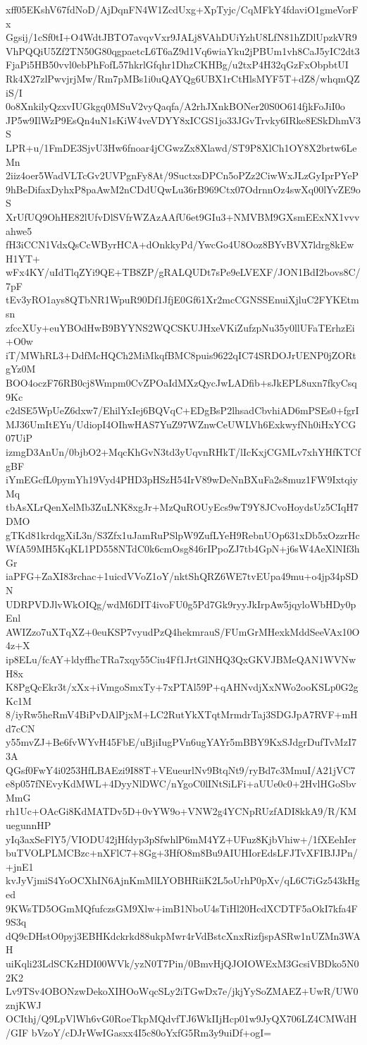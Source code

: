 xff05EKshV67fdNoD/AjDqnFN4W1ZcdUxg+XpTyjc/CqMFkY4fdaviO1gmeVorFx
Ggsij/1cSf0tI+O4WdtJBTO7avqvVxr9JALj8VAhDUiYzhU8LfN81hZDlUpzkVR9
VhPQQiU5Zf2TN50G80qgpaetcL6T6aZ9d1Vq6wiaYku2jPBUm1vh8CaJ5yIC2dt3
FjaPi5HB50vvl0ebPhFofL57hkrlGfqhr1DhzCKHBg/u2txP4H32qGzFxObpbtUI
Rk4X27zlPwvjrjMw/Rm7pMBs1i0uQAYQg6UBX1rCtHlsMYF5T+dZ8/whqmQZiS/I
0o8XnkilyQzxvIUGkgq0MSuV2vyQaqfa/A2rhJXnkBONer20S0O614fjkFoJiI0o
JP5w9IlWzP9EsQn4uN1sKiW4veVDYY8xICGS1jo33JGvTrvky6IRke8ESkDhmV3S
LPR+u/1FmDE3SjvU3Hw6fnoar4jCGwzZx8Xlawd/ST9P8XlCh1OY8X2brtw6LeMn
2iiz4oer5WadVLTcGv2UVPgnFy8At/9SuctxsDPCn5oPZz2CiwWxJLzGyIprPYeP
9hBeDifaxDyhxP8paAwM2nCDdUQwLu36rB969Ctx07OdrnnOz4swXq00lYvZE9oS
XrUfUQ9OhHE82lUfvDlSVfrWZAzAAfU6et9GIu3+NMVBM9GXsmEExNX1vvvahwe5
fH3iCCN1VdxQsCcWByrHCA+dOnkkyPd/YwcGo4U8Ooz8BYvBVX7ldrg8kEwH1YT+
wFx4KY/uIdTlqZYi9QE+TB8ZP/gRALQUDt7sPe9eLVEXF/JON1BdI2bovs8C/7pF
tEv3yRO1ays8QTbNR1WpuR90Df1JfjE0Gf61Xr2mcCGNSSEnuiXjluC2FYKEtmsn
zfccXUy+euYBOdHwB9BYYNS2WQCSKUJHxeVKiZufzpNu35y0llUFaTErhzEi+O0w
iT/MWhRL3+DdfMcHQCh2MiMkqfBMC8puis9622qIC74SRDOJrUENP0jZORtgYz0M
BOO4oczF76RB0cj8Wmpm0CvZPOaIdMXzQycJwLADfib+sJkEPL8uxn7fkyCsq9Kc
c2dSE5WpUeZ6dxw7/EhilYxIej6BQVqC+EDgBsP2lhsadCbvhiAD6mPSEs0+fgrI
MJ36UmItEYu/UdiopI4OIhwHAS7YuZ97WZnwCeUWLVh6ExkwyfNh0iHxYCG07UiP
izmgD3AnUn/0bjbO2+MqcKhGvN3td3yUqvnRHkT/lIcKxjCGMLv7xhYHfKTCfgBF
iYmEGcfL0pymYh19Vyd4PHD3pHSzH54IrV89wDeNnBXuFa2s8muz1FW9IxtqiyMq
tbAsXLrQenXelMb3ZuLNK8xgJr+MzQuROUyEcs9wT9Y8JCvoHoydsUz5CIqH7DMO
gTKd81krdqgXiL3n/S3Zfx1uJamRuPSlpW9ZufLYeH9RebnUOp631xDb5xOzzrHc
WfA59MH5KqKL1PD558NTdC0k6cmOsg846rIPpoZJ7tb4GpN+j6sW4AeXlNIf3hGr
iaPFG+ZaXI83rchac+1uicdVVoZ1oY/nktShQRZ6WE7tvEUpa49mu+o4jp34pSDN
UDRPVDJlvWkOIQg/wdM6DIT4ivoFU0g5Pd7Gk9ryyJkIrpAw5jqyloWbHDy0pEnl
AWIZzo7uXTqXZ+0euKSP7vyudPzQ4hekmrauS/FUmGrMHexkMddSeeVAx10O4z+X
ip8ELu/fcAY+ldyffhcTRa7xqy55Ciu4Ff1JrtGlNHQ3QxGKVJBMeQAN1WVNwH8x
K8PgQcEkr3t/xXx+iVmgoSmxTy+7xPTAl59P+qAHNvdjXxNWo2ooKSLp0G2gKc1M
8/iyRw5heRmV4BiPvDAlPjxM+LC2RutYkXTqtMrmdrTaj3SDGJpA7RVF+mHd7cCN
y55mvZJ+Be6fvWYvH45FbE/uBjiIugPVn6ugYAYr5mBBY9KxSJdgrDufTvMzI73A
QGsf0FwY4i0253HfLBAEzi9I88T+VEueurlNv9BtqNt9/ryBd7c3MmuI/A21jVC7
e8p057fNEvyKdMWL+4DyyNlDWC/nYgoC0lINtSiLFi+aUUe0c0+2HvlHGoSbvMmG
rh1Uc+OAcGi8KdMATDv5D+0vYW9o+VNW2g4YCNpRUzfADI8kkA9/R/KMuegunnHP
yIq3axSeFlY5/VIODU42jHfdyp3pSfwhlP6mM4YZ+UFuz8KjbVhiw+/1fXEehIer
buTVOLPLMCBzc+nXFlC7+8Gg+3HfO8m8Bu9AIUHIorEdsLFJTvXFIBJJPn/+jnE1
kvJyVjmiS4YoOCXhIN6AjnKmMlLYOBHRiiK2L5oUrhP0pXv/qL6C7iGz543kHged
9KWsTD5OGmMQfufczsGM9Xlw+imB1NboU4sTiHl20HcdXCDTF5aOkI7kfa4F9S3q
dQ9cDHstO0pyj3EBHKdckrkd88ukpMwr4rVdBstcXnxRizfjspASRw1nUZMn3WAH
uiKqli23LdSCKzHDI00WVk/yzN0T7Pin/0BmvHjQJOIOWExM3GcsiVBDko5N02K2
Lv9TSv4OBONzwDekoXIHOoWqcSLy2iTGwDx7e/jkjYySoZMAEZ+UwR/UW0znjKWJ
OCIthj/Q9LpVlWh6vG0RoeTkpMQdvfTJ6WkIIjHcp01w9JyQX706LZ4CMWdH/GIF
bVzoY/cDJrWwIGasxx4I5c80oYxfG5Rm3y9uiDf+ogI=
